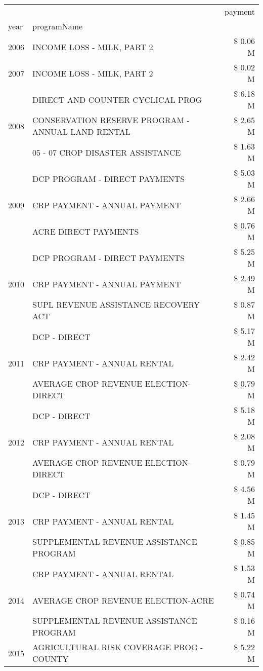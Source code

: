 \begin{tabular}{llr}
\toprule
 &  & payment \\
year & programName &  \\
\midrule
2006 & INCOME LOSS - MILK, PART 2 & \$ 0.06 M \\
\cline{1-3}
2007 & INCOME LOSS - MILK, PART 2 & \$ 0.02 M \\
\cline{1-3}
\multirow[t]{3}{*}{2008} & DIRECT AND COUNTER CYCLICAL PROG & \$ 6.18 M \\
 & CONSERVATION RESERVE PROGRAM - ANNUAL LAND RENTAL & \$ 2.65 M \\
 & 05 - 07 CROP DISASTER ASSISTANCE & \$ 1.63 M \\
\cline{1-3}
\multirow[t]{3}{*}{2009} & DCP PROGRAM - DIRECT PAYMENTS & \$ 5.03 M \\
 & CRP PAYMENT - ANNUAL PAYMENT & \$ 2.66 M \\
 & ACRE DIRECT PAYMENTS & \$ 0.76 M \\
\cline{1-3}
\multirow[t]{3}{*}{2010} & DCP PROGRAM - DIRECT PAYMENTS & \$ 5.25 M \\
 & CRP PAYMENT - ANNUAL PAYMENT & \$ 2.49 M \\
 & SUPL REVENUE ASSISTANCE RECOVERY ACT & \$ 0.87 M \\
\cline{1-3}
\multirow[t]{3}{*}{2011} & DCP - DIRECT & \$ 5.17 M \\
 & CRP PAYMENT - ANNUAL RENTAL & \$ 2.42 M \\
 & AVERAGE CROP REVENUE ELECTION-DIRECT & \$ 0.79 M \\
\cline{1-3}
\multirow[t]{3}{*}{2012} & DCP - DIRECT & \$ 5.18 M \\
 & CRP PAYMENT - ANNUAL RENTAL & \$ 2.08 M \\
 & AVERAGE CROP REVENUE ELECTION-DIRECT & \$ 0.79 M \\
\cline{1-3}
\multirow[t]{3}{*}{2013} & DCP - DIRECT & \$ 4.56 M \\
 & CRP PAYMENT - ANNUAL RENTAL & \$ 1.45 M \\
 & SUPPLEMENTAL REVENUE ASSISTANCE PROGRAM & \$ 0.85 M \\
\cline{1-3}
\multirow[t]{3}{*}{2014} & CRP PAYMENT - ANNUAL RENTAL & \$ 1.53 M \\
 & AVERAGE CROP REVENUE ELECTION-ACRE & \$ 0.74 M \\
 & SUPPLEMENTAL REVENUE ASSISTANCE PROGRAM & \$ 0.16 M \\
\cline{1-3}
\multirow[t]{3}{*}{2015} & AGRICULTURAL RISK COVERAGE PROG - COUNTY & \$ 5.22 M \\

\end{tabular}
